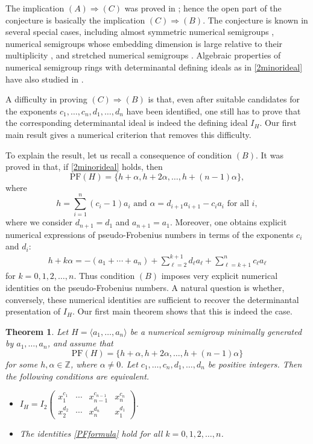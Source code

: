 \documentclass[12pt]{amsart}
\numberwithin{equation}{section}
\newtheorem{theorem}{Theorem}[section]
\theoremstyle{definition}
\newcommand{\PF}{\mathrm{PF}}
\begin{document}
The implication $(A)\Rightarrow(C)$ was proved in \cite{KM}; hence the open part of the conjecture is basically the implication $(C)\Rightarrow(B)$. The conjecture is known in several special cases, including almost symmetric numerical semigroups \cite{GKMT}, numerical semigroups whose embedding dimension is large relative to their multiplicity \cite{KM,Ta}, and stretched numerical semigroups \cite{KMO}.
Algebraic properties of numerical semigroup rings with determinantal defining ideals as in \eqref{2minorideal} have also studied in \cite{KMN}.


A difficulty in proving $(C)\Rightarrow(B)$ is that, even after suitable candidates for the exponents
$c_1,\dots,c_n,d_1,\dots,d_n$
have been identified, one still has to prove that the corresponding determinantal ideal is indeed the defining ideal $I_H$. Our first main result gives a numerical criterion that removes this difficulty.

To explain the result, let us recall a consequence of condition $(B)$. It was proved in \cite[Theorem 3]{KM} that, if \eqref{2minorideal} holds, then
\[
\PF(H)
=
\{h+\alpha,h+2\alpha,\dots,h+(n-1)\alpha\},
\]
where
\[
h=\sum_{i=1}^n(c_i-1)a_i
\text{ and }
\alpha=d_{i+1}a_{i+1}-c_ia_i \text{ for all 
$i$},
\]
where we consider $d_{n+1}=d_1$ and $a_{n+1}=a_1$. Moreover, one obtains explicit numerical expressions of pseudo-Frobenius numbers in terms of the exponents $c_i$ and $d_i$:
\begin{align}
\label{PFformula}
h+k\alpha
=
-(a_1+\cdots+a_n)
+
\sum_{\ell=2}^{k+1}d_\ell a_\ell
+
\sum_{\ell=k+1}^{n}c_\ell a_\ell
\end{align}
for $k=0,1,2,\dots,n$.
Thus condition $(B)$ imposes very explicit numerical identities on the pseudo-Frobenius numbers. A natural question is whether, conversely, these numerical identities are sufficient to recover the determinantal presentation of $I_H$. Our first main theorem shows that this is indeed the case.

\begin{theorem}
\label{maincor}
Let
$H=\langle a_1,\dots,a_n\rangle$
be a numerical semigroup minimally generated by $a_1,\dots,a_n$, and assume that
\[
\PF(H)
=
\{h+\alpha,h+2\alpha,\dots,h+(n-1)\alpha\}
\]
for some $h,\alpha\in\mathbb Z$, where $\alpha \ne 0$. Let
$c_1,\dots,c_n,d_1,\dots,d_n$
be positive integers. Then the following conditions are equivalent.
\begin{itemize}
    \item[(1)]
    $I_H
    =
    I_2
    \begin{pmatrix}
    x_1^{c_1} & \cdots & x_{n-1}^{c_{n-1}} & x_n^{c_n}\\
    x_2^{d_2} & \cdots & x_n^{d_n} & x_1^{d_1}
    \end{pmatrix}.
    $
    \item[(2)] The identities \eqref{PFformula} hold for all $k=0,1,2,\dots,n$.
\end{itemize}
\end{theorem}
\end{document}
